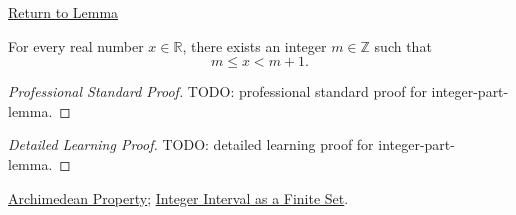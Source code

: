 \newpage
{}
\label{prf:integer-part-lemma}

\begin{remark*}[Return]
\hyperref[lem:integer-part-lemma]{Return to Lemma}
\end{remark*}

\begin{lemma*}
For every real number $x\in\mathbb{R}$, there exists an integer
$m\in\mathbb{Z}$ such that
\[
m\le x<m+1.
\]
\end{lemma*}

\begin{proof}[Professional Standard Proof]
\LRAProofBodyStart
TODO: professional standard proof for integer-part-lemma.
\end{proof}

\begin{proof}[Detailed Learning Proof]
\LRAProofBodyStart
TODO: detailed learning proof for integer-part-lemma.
\end{proof}

\begin{remark*}
\end{remark*}

\begin{dependencies}
\hyperref[thm:archimedean-property]{Archimedean Property};
\hyperref[prop:integer-interval-finite-set-summation]{Integer Interval as a Finite Set}.
\end{dependencies}

\clearpage
